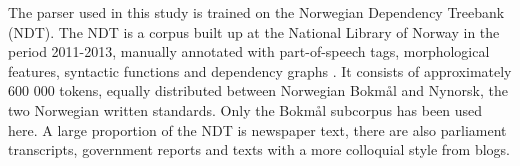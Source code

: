 \documentclass[a4paper, 12pt]{article}
\begin{document}
The parser used in this study is trained on the Norwegian Dependency Treebank (NDT). The NDT is a corpus built up at the National Library of Norway in the period 2011-2013, manually annotated with part-of-speech tags, morphological features, syntactic functions and dependency graphs \citep{Sol14, Sol13}. It consists of approximately 600 000 tokens, equally distributed between Norwegian Bokmål and Nynorsk, the two Norwegian written standards. Only the Bokmål subcorpus has been used here. A large proportion of the NDT is newspaper text, there are also parliament transcripts, government reports and texts with a more colloquial style from blogs.





\end{document}

